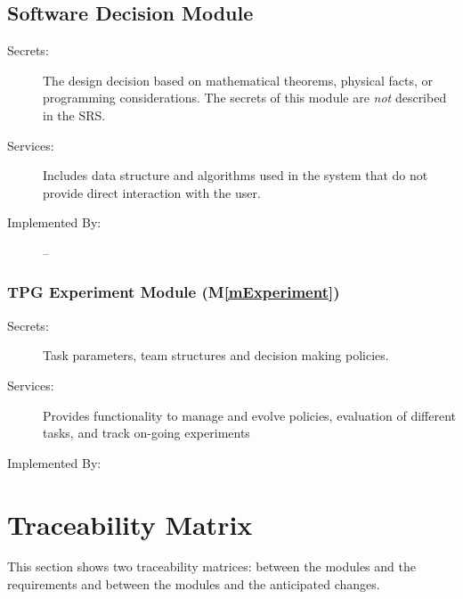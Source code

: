 \documentclass[12pt, titlepage]{article}
\newcommand{\mref}[1]{M\ref{#1}}
\begin{document}


\subsection{Software Decision Module}

\begin{description}
\item[Secrets:] The design decision based on mathematical theorems, physical
  facts, or programming considerations. The secrets of this module are
  \emph{not} described in the SRS.
\item[Services:] Includes data structure and algorithms used in the system that
  do not provide direct interaction with the user. 
\item[Implemented By:] --
\end{description}

\subsubsection{TPG Experiment Module (\mref{mExperiment})}
\begin{description}
  \item[Secrets:] Task parameters, team structures and decision making policies.
  \item[Services:] Provides functionality to manage and evolve policies, evaluation of different tasks, and track on-going experiments
  \item[Implemented By:] \progname{}
  \end{description}

\section{Traceability Matrix} \label{SecTM}

This section shows two traceability matrices: between the modules and the
requirements and between the modules and the anticipated changes.
\end{document}
